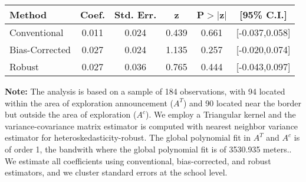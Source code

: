 \begin{table}[htbp]\centering
 \footnotesize 
\begin{tabular}{lccccc}
\hline\hline
Method & Coef. & Std. Err. & z & P$>|$z$|$ & [95\% C.I.] \\ 
\hline \hline  
Conventional & 0.011 & 0.024 & 0.439 & 0.661 & [-0.037,0.058] \\ 
 Bias-Corrected & 0.027 & 0.024 & 1.135 & 0.257 & [-0.020,0.074] \\ 
Robust & 0.027 & 0.036 & 0.765 & 0.444 & [-0.043,0.097] \\ 
  \hline\hline
\end{tabular}
\label{table:rd}
\begin{tablenotes} 
  \justifying \tiny \textbf{Note: }    
   The analysis is based on a sample of 184 observations, with 94 located within the area of exploration announcement ($A^{T}$) and 90 located near the border but outside the area of exploration  ($A^{c}$). 
           We employ a Triangular kernel and the variance-covariance matrix estimator is computed with nearest neighbor variance estimator for heteroskedasticity-robust. The global polynomial fit in  $A^{T}$ and $A^{c}$ is of order 1, the bandwith where the global polynomial fit is of 3530.935 meters.. We estimate all coefficients using conventional, bias-corrected, and robust estimators, and we cluster standard errors at the school level. \end{tablenotes} 
 \end{table} 
